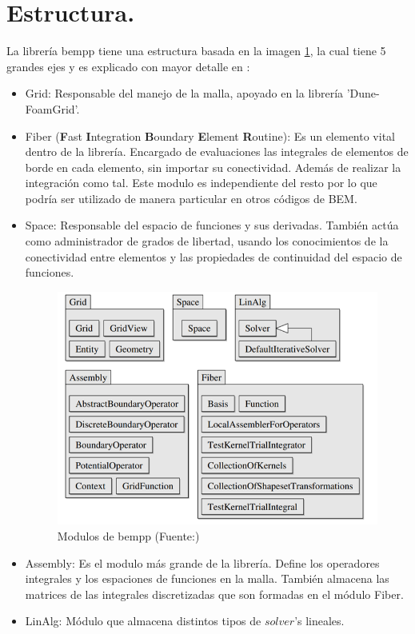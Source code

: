 \section{Estructura.}
La librería bempp tiene una estructura basada en la imagen \ref{fig:Estructura BEM}, la cual tiene 5 grandes ejes y es explicado con mayor detalle en \cite{Solvingwithbempp}:
\begin{itemize}
\item Grid: Responsable del manejo de la malla, apoyado en la librería 'Dune-FoamGrid'.
\item Fiber (\textbf{F}ast \textbf{I}ntegration \textbf{B}oundary \textbf{E}lement \textbf{R}outine): Es un elemento vital dentro de la librería. Encargado de evaluaciones las integrales de elementos de borde en cada elemento, sin importar su conectividad. Además de realizar la integración como tal. Este modulo es independiente del resto por lo que podría ser utilizado de manera particular en otros códigos de BEM.
\item Space: Responsable del espacio de funciones y sus derivadas. También actúa como administrador de grados de libertad, usando los conocimientos de la conectividad entre elementos y las propiedades de continuidad del espacio de funciones.
\begin{figure}[H]
\centering
\includegraphics[scale=0.7]{Imagenes/estructurabempp.png}
\caption{Modulos de bempp (Fuente:\cite{Solvingwithbempp})}\label{fig:Estructura BEM}
\end{figure}
\item Assembly: Es el modulo más grande de la librería. Define los operadores integrales y los espaciones de funciones en la malla. También almacena las matrices de las integrales discretizadas que son formadas en el módulo Fiber.
\item LinAlg: Módulo que almacena distintos tipos de $solver$'s lineales. 
\end{itemize} 


